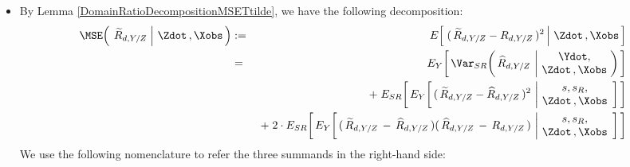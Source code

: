 \begin{itemize}
\item
    By Lemma \ref{DomainRatioDecompositionMSETtilde}, we have the following decomposition:
    \begin{eqnarray*}
    \MSE\!\left(\;
        \left.
        \widetilde{R}_{d,Y/Z}
        \;\right\vert\,
        \Zdot\,,\Xobs
        \,\right)
    & := &
        E\!\left[\,
            \left.
            (\,\widetilde{R}_{d,Y/Z} - R_{d,Y/Z}\,)^{2}
            \,\right\vert\,
            \Zdot\,,\Xobs
            \,\right]
    \\
    & = &
        E_{Y}\!\left[\,
        \Var_{SR}\!\left(\,
            \widehat{R}_{d,Y/Z}
            \,\left\vert\!
            \begin{array}{c} \Ydot, \\ \Zdot\,,\Xobs \end{array}
            \right.
            \!\!\right)
            \,\right]
    \\
    &&
        \;+\;
        E_{SR}\!\left[\,
        E_{Y}\!\left[\,
            (\,\widetilde{R}_{d,Y/Z} - \widehat{R}_{d,Y/Z}\,)^{2}
            \,\left\vert\!
            \begin{array}{c} s,s_{R}, \\ \Zdot\,,\Xobs \end{array}
            \right.
            \!\right]
            \,\right]
    \\
    &&
        \;+\;
        2\cdot
        E_{SR}\!\left[\,
        E_{Y}\!\left[\,
            (\,\widetilde{R}_{d,Y/Z} \,-\, \widehat{R}_{d,Y/Z}\,)(\,\widehat{R}_{d,Y/Z} \,-\, R_{d,Y/Z}\,)
            \,\left\vert\!
            \begin{array}{c} s,s_{R}, \\ \Zdot\,,\Xobs \end{array}
            \right.
            \!\right]
            \,\right]
    \end{eqnarray*}
    We use the following nomenclature to refer the three summands in the right-hand side:

\end{itemize}
